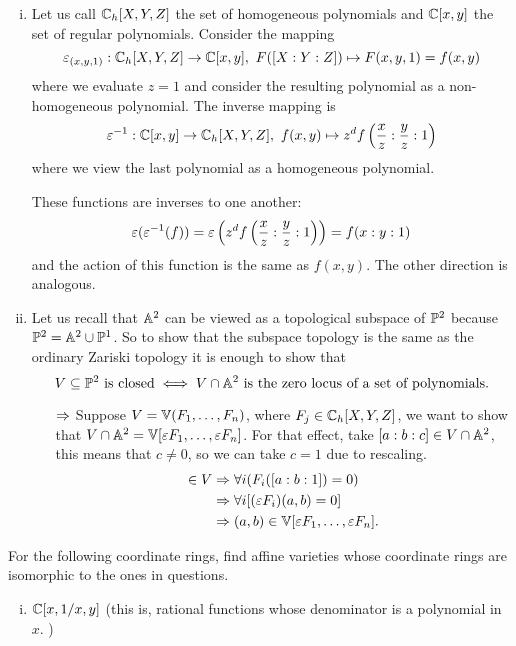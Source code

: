 \documentclass[12pt]{memoir}
\begin{document}
  \begin{ptcbr}
    \begin{enumerate}[i)]
      \itemsep=-0.4em 
      \item Let us call $\mathbb{C}_h[X,Y,Z]$ the set of homogeneous polynomials and $\mathbb{C}[x,y]$ the set of regular polynomials. Consider the mapping
      $$\eps_{(x,y,1)}:\bC_h[X,Y,Z]\to \bC[x,y],\ F([X:Y:Z])\mapsto F(x,y,1)=f(x,y)$$
      where we evaluate $z=1$ and consider the resulting polynomial as a non-homogeneous polynomial. The inverse mapping is 
      $$\varepsilon^{-1}:\mathbb{C}[x,y]\to\mathbb{C}_h[X,Y,Z],\ f(x,y)\mapsto z^df\left(\frac xz:\frac yz:1\right)$$
      where we view the last polynomial as a homogeneous polynomial.\par 
      These functions are inverses to one another:
      $$\varepsilon(\varepsilon^{-1}(f))=\varepsilon\left(z^df\left(\frac xz:\frac yz:1\right)\right)=f(x:y:1)$$
      and the action of this function is the same as $f(x,y)$. The other direction is analogous.
      \item Let us recall that $\mathbb{A}^2$ can be viewed as a topological subspace of $\mathbb{P}^2$ because $\mathbb{P}^2=\mathbb{A}^2\cup\mathbb{P}^1$. So to show that the subspace topology is the same as the ordinary Zariski topology it is enough to show that 
      $$V\subseteq\bP^2\ \text{is closed} \iff V\cap\bA^2\ \text{is the zero locus of a set of polynomials}.$$
      \begin{enumerate}
        \itemsep=-0.4em
        \item[$\Rightarrow$] Suppose $V=\mathbb{V}(F_1,\dots,F_n)$, where $F_j\in\mathbb{C}_h[X,Y,Z]$, we want to show that $V\cap \mathbb{A}^2=\mathbb{V}[\varepsilon F_1,\dots,\varepsilon F_n]$. For that effect, take $[a:b:c]\in V\cap\mathbb{A}^2$, this means that $c\neq 0$, so we can take $c=1$ due to rescaling.
        \begin{align*}
          [a:b:1]\in V&\To \forall i(F_i([a:b:1])=0)\\
          &\To\forall i[(\eps F_i)(a,b)=0]\\
          &\To (a,b)\in \bV[\eps F_1,\dots,\eps F_n].
        \end{align*}
      \end{enumerate}
    \end{enumerate}
  \end{ptcbr}
  \begin{Ej}
    For the following coordinate rings, find affine varieties whose coordinate rings are isomorphic to the ones in questions.
    \begin{enumerate}[i)]
      \itemsep=-0.4em
      \item $\mathbb{C}[x,1/x,y]$ (this is, rational functions whose denominator is a polynomial in $x$. )
    \end{enumerate}
  \end{Ej}
\end{document}
